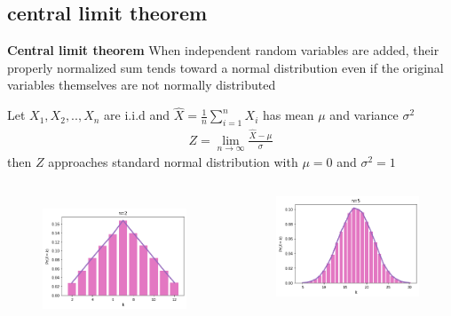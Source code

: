 \documentclass{beamer}
\begin{document}
\subsection{central limit theorem}
\begin{frame}{\textbf{Central limit theorem}}
    { \small
    When independent random variables are added, their properly normalized sum tends toward a normal distribution even if the original variables themselves are not normally distributed}%
    \begin{block}{}
       {\small Let  $X_1 ,X_2 ,..,X_n$ are i.i.d and $\hat X=\frac{1}{n}\sum \limits_{i=1}^{n}X_i $ has mean $\mu $ and variance $\sigma^2$
       \begin{align}
        Z=\lim \limits_{n \to \infty } \frac{\hat X - \mu }{\sigma }    
       \end{align}
        then $Z$ approaches standard normal distribution with $\mu = 0$ and $\sigma^2 = 1$  }%
    \end{block}
    \begin{columns}[onlytextwidth]
    \begin{figure}
        \centering
        \includegraphics[scale=0.22]{figures/CLT/n=2.png}
        \label{fig:my_label}
    \end{figure}
    \begin{figure}
        \centering
        \includegraphics[scale=0.22]{figures/CLT/n=5.png}

\end{figure}
\end{columns}
\end{frame}
\end{document}
